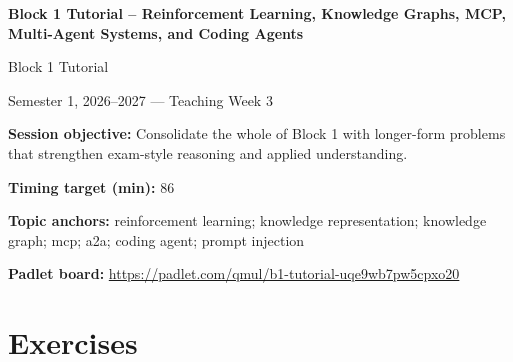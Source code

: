 \documentclass[11pt]{article}
\begin{document}
\begin{center}\LARGE\bfseries Block 1 Tutorial -- Reinforcement Learning, Knowledge Graphs, MCP, Multi-Agent Systems, and Coding Agents\end{center}

\begin{center}\large Block 1 Tutorial\end{center}

\begin{center}Semester 1, 2026--2027 --- Teaching Week 3\end{center}

\begin{tcolorbox}[colback=MidnightBlue!4,colframe=MidnightBlue,title={Session Overview},fonttitle=\bfseries,breakable]
\textbf{Session objective:} Consolidate the whole of Block 1 with longer-form problems that strengthen exam-style reasoning and applied understanding.

\textbf{Timing target (min):} 86

\textbf{Topic anchors:} reinforcement learning; knowledge representation; knowledge graph; mcp; a2a; coding agent; prompt injection

\textbf{Padlet board:} \url{https://padlet.com/qmul/b1-tutorial-uqe9wb7pw5cpxo20}
\end{tcolorbox}

\section*{Exercises}
\end{document}
